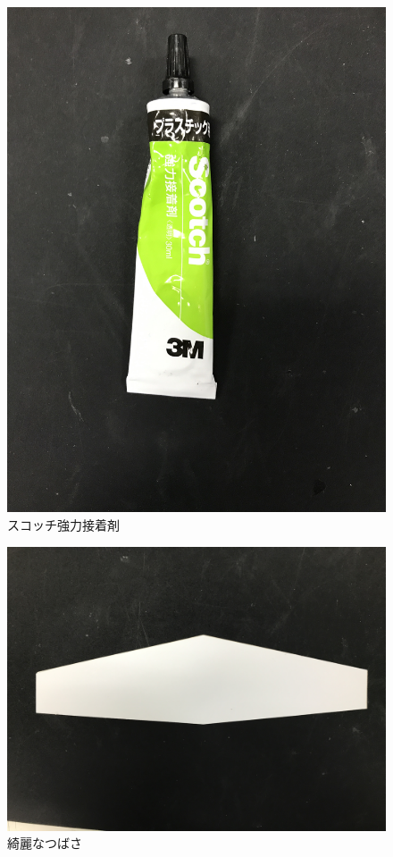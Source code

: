 \begin{figure}[htbp]
  \begin{center}
    \includegraphics[width=140mm]{sc.JPG}
    \end{center}
  \caption{スコッチ強力接着剤}
 \label{fig:sc}
\end{figure}


\begin{figure}[htbp]
  \begin{center}
    \includegraphics[width=140mm]{OK.JPG}
    \end{center}
  \caption{綺麗なつばさ}
 \label{fig:OK}
\end{figure}

